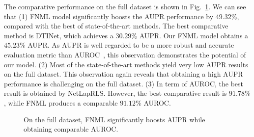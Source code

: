 \documentclass[conference]{IEEEtran}
\begin{document}
The comparative performance on the full dataset is shown in Fig.~\ref{fig:full}. We can see that (1) FNML model significantly boosts the AUPR performance by $49.32\%$, compared with the best of state-of-the-art methods. The best comparative method is DTINet, which achieves a $30.29\%$ AUPR. Our FNML model obtains a $45.23\%$ AUPR. As AUPR is well regarded to be a more robust and accurate evaluation metric than AUROC~\cite{Luo2017Network}, this observation demonstrates the potential of our model. (2) Most of the state-of-the-art methods yield very low AUPR results on the full dataset. This observation again reveals that obtaining a high AUPR performance is challenging on the full dataset. (3) In term of AUROC, the best result is obtained by NetLapRLS. However, the best comparative result is $91.78\%$, while FNML produces a comparable $91.12\%$ AUROC. 


\begin{figure}[t]
\centering
{}
\vspace*{-10pt}
\caption{On the full dataset, FNML significantly boosts AUPR while obtaining comparable AUROC.}\label{fig:full}
\end{figure}
\end{document}
